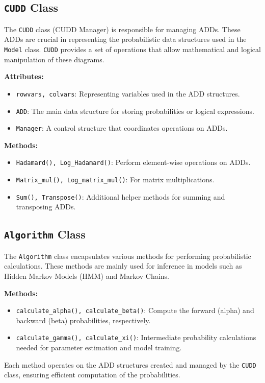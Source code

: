 \subsection{\texttt{CUDD} Class}
The \texttt{CUDD} class (CUDD Manager) is responsible for managing ADDs. These ADDs are crucial in representing the probabilistic data structures used in the \texttt{Model} class. \texttt{CUDD} provides a set of operations that allow mathematical and logical manipulation of these diagrams.

\textbf{Attributes:}
\begin{itemize}
    \item \texttt{rowvars, colvars}: Representing variables used in the ADD structures.
    \item \texttt{ADD}: The main data structure for storing probabilities or logical expressions.
    \item \texttt{Manager}: A control structure that coordinates operations on ADDs.
\end{itemize}
\textbf{Methods:}
\begin{itemize}
    \item \texttt{Hadamard(), Log\_Hadamard()}: Perform element-wise operations on ADDs.
    \item \texttt{Matrix\_mul(), Log\_matrix\_mul()}: For matrix multiplications.
    \item \texttt{Sum(), Transpose()}: Additional helper methods for summing and transposing ADDs.
\end{itemize}

\subsection{\texttt{Algorithm} Class}
The \texttt{Algorithm} class encapsulates various methods for performing probabilistic calculations. These methods are mainly used for inference in models such as Hidden Markov Models (HMM) and Markov Chains.

\textbf{Methods:}
\begin{itemize}
    \item \texttt{calculate\_alpha(), calculate\_beta()}: Compute the forward (alpha) and backward (beta) probabilities, respectively.
    \item \texttt{calculate\_gamma(), calculate\_xi()}: Intermediate probability calculations needed for parameter estimation and model training.
\end{itemize}
Each method operates on the ADD structures created and managed by the \texttt{CUDD} class, ensuring efficient computation of the probabilities.

